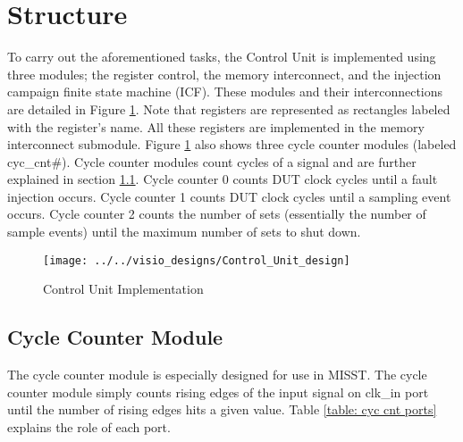 \documentclass[]{report}
\begin{document}
\section{Structure}
\label{s cu structure}
To carry out the aforementioned tasks, the Control Unit is implemented using three modules; the register control, the memory interconnect, and the injection campaign finite state machine (ICF). These modules and their interconnections are detailed in Figure \ref{fig:control unit design}. Note that registers are represented as rectangles labeled with the register's name. All these registers are implemented in the memory interconnect submodule. Figure \ref{fig:control unit design} also shows three cycle counter modules (labeled cyc\_cnt\#). Cycle counter modules count cycles of a signal and are further explained in section \ref{ss cyc cnt}. Cycle counter 0 counts DUT clock cycles until a fault injection occurs. Cycle counter 1 counts DUT clock cycles until a sampling event occurs. Cycle counter 2 counts the number of sets (essentially the number of sample events) until the maximum number of sets to shut down. 

\clearpage
\begin{figure}[h]
	\centering
	\texttt{[image: ../../visio\_designs/Control\_Unit\_design]}
	\caption{Control Unit Implementation}
	\label{fig:control unit design}
\end{figure}

\clearpage
\subsection{Cycle Counter Module}
\label{ss cyc cnt}

The cycle counter module is especially designed for use in MISST. The cycle counter module simply counts rising edges of the input signal on clk\_in port until the number of rising edges hits a given value. Table \ref{table: cyc cnt ports} explains the role of each port.
\end{document}
